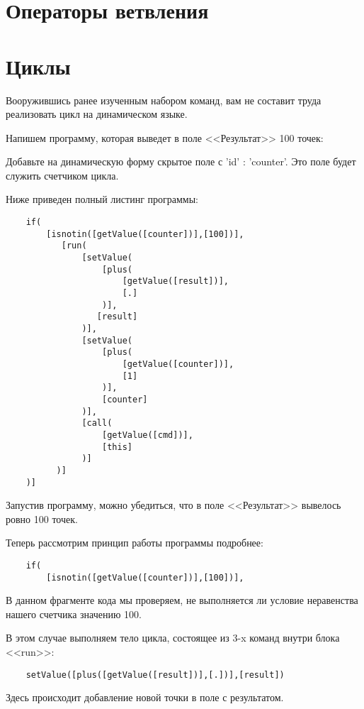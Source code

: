 \documentclass[10pt]{book}
\begin{document}
	\section{Операторы ветвления}
	
	\section{Циклы}
	
	Вооружившись ранее изученным набором команд, вам не составит труда реализовать цикл на динамическом языке.
	
	Напишем программу, которая выведет в поле <<Результат>> 100 точек:
	
	Добавьте  на динамическую форму скрытое поле с 'id' : 'counter'. Это поле будет служить счетчиком цикла.
	
	Ниже приведен полный листинг программы:
	
	\begin{verbatim}
	if(
	    [isnotin([getValue([counter])],[100])],
	       [run(
	           [setValue(
	               [plus(
	                   [getValue([result])],
	                   [.]
                   )],
	              [result]
	           )],
               [setValue(
	               [plus(
	                   [getValue([counter])],
	                   [1]
	               )],
	               [counter]
	           )],
	           [call(
	               [getValue([cmd])],
	               [this]
	           )]
	      )]
	)]
	\end{verbatim}
	
	Запустив программу, можно убедиться, что в поле <<Результат>> вывелось ровно 100 точек.
	
	Теперь рассмотрим принцип работы программы подробнее:
	
	\begin{verbatim}
	if(
	    [isnotin([getValue([counter])],[100])],
	\end{verbatim}
	
	В данном фрагменте кода мы проверяем, не выполняется ли условие неравенства нашего счетчика значению 100.
	
	В этом случае выполняем тело цикла, состоящее из 3-x команд внутри блока <<run>>:
	
	\begin{verbatim}
	setValue([plus([getValue([result])],[.])],[result])
	\end{verbatim}
	
	Здесь происходит добавление новой точки в поле с результатом.
	
\end{document}
